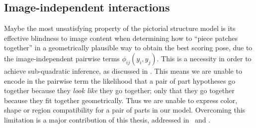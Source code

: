 \subsection{Image-independent interactions}  Maybe the most unsatisfying 
property of the pictorial structure model is its effective blindness to image 
content when determining how to ``piece patches together'' in a geometrically 
plausible way to obtain the best scoring pose, due to the image-independent 
pairwise terms $\phi_{ij}(y_i,y_j)$.  This is a necessity in order to achieve
sub-quadratic inference, as discussed in .  This means we are unable 
to encode in the pairwise term the likelihood that a pair of part hypotheses go 
together because they {\em look like} they go together; only that they go 
together because they fit together geometrically.  Thus we are unable to 
express color, shape or region compatibility for a pair of parts in our model.  
Overcoming this limitation is a major contribution of this thesis, addressed 
in~ and .
